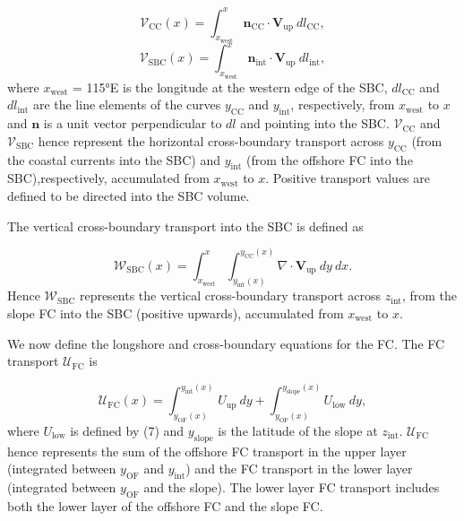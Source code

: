 \documentclass[preprint,3p,review,12pt]{elsarticle}
\renewcommand{\Vec}[1]{\mathbf{#1}}
\newcommand{\sub}[1]{_{\text{#1}}}
\begin{document}
\begin{equation} \label{eq:4}
\mathcal{V}\sub{CC}(x) = \int_{x\sub{west}}^{x}\Vec{n}\sub{CC}\cdot\Vec{V}\sub{up}\ dl\sub{CC},
\end{equation}
%
\begin{equation} \label{eq:5}
\mathcal{V}\sub{SBC}(x) = \int_{x\sub{west}}^{x}\Vec{n}\sub{int}\cdot\Vec{V}\sub{up}\ dl\sub{int},
\end{equation}
%
where $x\sub{west}$ = \ang{115}E is the longitude at the western edge of the SBC, $dl\sub{CC}$ and $dl\sub{int}$ are the line elements of the curves $y\sub{CC}$ and $y\sub{int}$, respectively, from $x\sub{west}$ to $x$ and $\Vec{n}$ is a unit vector perpendicular to $dl$ and pointing into the SBC\@.
$\mathcal{V}\sub{CC}$ and $\mathcal{V}\sub{SBC}$ hence represent the horizontal cross-boundary transport across $y\sub{CC}$ (from the coastal currents into the SBC) and $y\sub{int}$ (from the offshore FC into the SBC),respectively, accumulated from $x\sub{west}$ to $x$. Positive transport values are defined to be directed into the SBC volume.

The vertical cross-boundary transport into the SBC is defined as

\begin{equation} \label{eq:6}
\mathcal{W}\sub{SBC}(x)
= \int_{x\sub{west}}^{x} \int_{y\sub{int}(x)}^{y\sub{CC}(x)} \nabla\cdot\Vec{V}\sub{up}\ dy\ dx.
\end{equation}
%
Hence $\mathcal{W}\sub{SBC}$ represents the vertical cross-boundary transport across $z\sub{int}$, from the slope FC into the SBC (positive upwards), accumulated from $x\sub{west}$ to $x$.

We now define the longshore and cross-boundary equations for the FC\@. The FC transport $\mathcal{U}\sub{FC}$ is 

\begin{equation} \label{eq:7}
\mathcal{U}\sub{FC}(x) = \int_{y\sub{OF}(x)}^{y\sub{int}(x)}{U}\sub{up}\ dy
+ \int_{y\sub{OF}(x)}^{y\sub{slope}(x)}{U}\sub{low}\ dy,
\end{equation}
%
where $U\sub{low}$ is defined by (7) and $y\sub{slope}$ is the latitude of the slope at $z\sub{int}$. $\mathcal{U}\sub{FC}$ hence represents the sum of the offshore FC transport in the upper layer (integrated between $y\sub{OF}$ and $y\sub{int}$) and the FC transport in the lower layer (integrated between $y\sub{OF}$ and the slope). The lower layer FC transport includes both the lower layer of the offshore FC and the slope FC.
\end{document}

